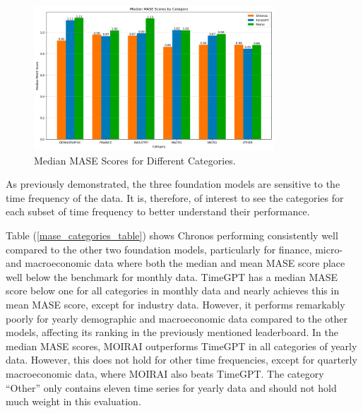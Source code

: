 \documentclass[12pt,a4paper]{article}
\begin{document}
\begin{figure}[htbp]
  \centering
  \includegraphics[width=0.8\textwidth]{mase_categories.png}
  \caption{Median MASE Scores for Different Categories.}
  \label{mase_categories}
\end{figure}

As previously demonstrated, the three foundation models are sensitive to the time frequency of the data. It is, therefore, of interest to see the categories for each subset of time frequency to better understand their performance. 

Table (\ref{mase_categories_table}) shows Chronos performing consistently well compared to the other two foundation models, particularly for finance, micro- and macroeconomic data where both the median and mean MASE score place well below the benchmark for monthly data. TimeGPT has a median MASE score below one for all categories in monthly data and nearly achieves this in mean MASE score, except for industry data. However, it performs remarkably poorly for yearly demographic and macroeconomic data compared to the other models, affecting its ranking in the previously mentioned leaderboard. In the median MASE scores, MOIRAI outperforms TimeGPT in all categories of yearly data. However, this does not hold for other time frequencies, except for quarterly macroeconomic data, where MOIRAI also beats TimeGPT. The category “Other” only contains eleven time series for yearly data and should not hold much weight in this evaluation. 
\end{document}
